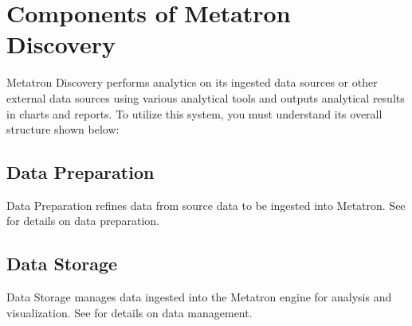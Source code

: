 \documentclass[letterpaper,10pt,english]{sphinxmanual}
\begin{document}
\section{Components of Metatron Discovery}
\label{\detokenize{discovery/part01/structure:metatron-discovery}}\label{\detokenize{discovery/part01/structure::doc}}
Metatron Discovery performs analytics on its ingested data sources or other external data sources using various analytical tools and outputs analytical results in charts and reports. To utilize this system, you must understand its overall structure shown below:
\begin{quote}

\begin{figure}[H]
\centering

\noindent{}
\end{figure}
\end{quote}


\subsection{Data Preparation}
\label{\detokenize{discovery/part01/structure:id1}}
Data Preparation refines data from source data to be ingested into Metatron. See {\hyperref[\detokenize{discovery/part07/index::doc}]{}} for details on data preparation.
\begin{quote}

\begin{figure}[H]
\centering

\noindent{}
\end{figure}

\begin{figure}[H]
\centering

\noindent{}
\end{figure}
\end{quote}


\subsection{Data Storage}
\label{\detokenize{discovery/part01/structure:id2}}
Data Storage manages data ingested into the Metatron engine for analysis and visualization. See {\hyperref[\detokenize{discovery/part02/index::doc}]{}} for details on data management.
\begin{quote}

\begin{figure}[H]
\centering

\noindent{}
\end{figure}

\begin{figure}[H]
\centering

\noindent{}
\end{figure}
\end{quote}
\end{document}
